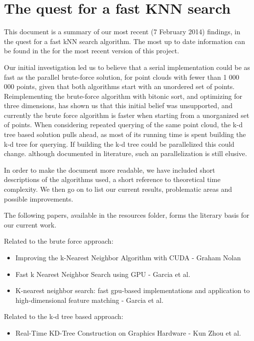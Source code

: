 \section{The quest for a fast KNN search} %
\label{sec:the_quest_for_a_fast_KNN_search}

This document is a summary of our most recent (7 February 2014) findings, in the quest for a fast kNN search algorithm. The most up to date information can be found in the
for the most recent version of this project.

Our initial investigation led us to believe that a serial implementation could be as fast as the parallel brute-force solution, for point clouds with fewer than 1 000 000 points, given that both algorithms start with an unordered set of points. Reimplementing the brute-force algorithm with bitonic sort, and optimizing for three dimensions, has shown us that this initial belief was unsupported, and currently the brute force algorithm is faster when starting from a unorganized set of points. When considering repeated querying of the same point cloud, the k-d tree based solution pulls ahead, as most of its running time is spent building the k-d tree for querying. If building the k-d tree could be parallelized this could change. although documented in literature, such an parallelization is still elusive.

In order to make the document more readable, we have included short descriptions of the algorithms used, a short reference to theoretical time complexity. We then go on to list our current results, problematic areas and possible improvements.

The following papers, available in the resources folder, forms the literary basis for our current work.

Related to the brute force approach:
\begin{itemize}
    \item Improving the k-Nearest Neighbor Algorithm with CUDA - Graham Nolan
    \item Fast k Nearest Neighbor Search using GPU - Garcia et al.
    \item K-nearest neighbor search: fast gpu-based implementations and application to high-dimensional feature matching - Garcia et al.
\end{itemize}

Related to the k-d tree based approach:
\begin{itemize}
    \item Real-Time KD-Tree Construction on Graphics Hardware - Kun Zhou et al.
\end{itemize}


